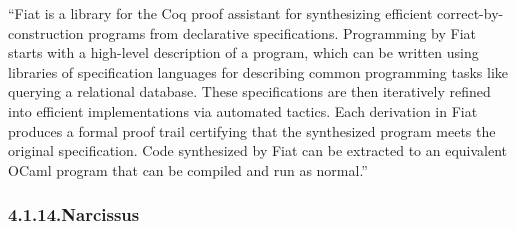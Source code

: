 \documentclass[12pt,twoside]{article}
\begin{document}
\noindent{}\textquotedblleft{}Fiat is a library for the Coq proof assistant for synthesizing
efficient correct-by-construction programs from declarative
specifications. Programming by Fiat starts with a high-level
description of a program, which can be written using libraries of
specification languages for describing common programming tasks like
querying a relational database. These specifications are then
iteratively refined into efficient implementations via automated
tactics. Each derivation in Fiat produces a formal proof trail
certifying that the synthesized program meets the original
specification. Code synthesized by Fiat can be extracted to an
equivalent OCaml program that can be compiled and run as normal.\textquotedblright{}%

\subsubsection{4.1.14.\hspace*{0.5em}Narcissus}\label{sec-narcissus}%
\end{document}

